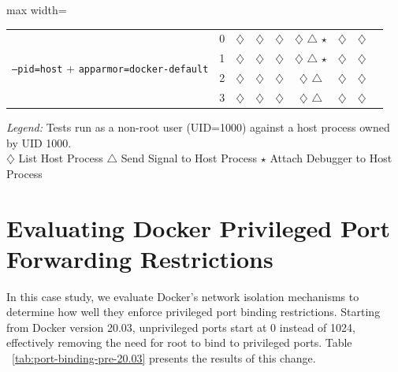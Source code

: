 \documentclass[12pt]{report}
\begin{document}
\begin{doublespace}
\begin{table}[!h]
\begin{adjustbox}{max width=\textwidth}
\begin{tabular}{|l|c|c|c|c|c|c|c|c|}
        \multirow{4}{*}{\texttt{--pid=host} + \texttt{apparmor=docker-default}} 
            & 0 & $\diamondsuit$ & $\diamondsuit$ & $\diamondsuit$ & $\diamondsuit$ $\triangle$ $\star$ & $\diamondsuit$ & $\diamondsuit$ \\
            & 1 & $\diamondsuit$ & $\diamondsuit$ & $\diamondsuit$ & $\diamondsuit$ $\triangle$ $\star$ & $\diamondsuit$ & $\diamondsuit$ \\
            & 2 & $\diamondsuit$ & $\diamondsuit$ & $\diamondsuit$ & $\diamondsuit$ $\triangle$ & $\diamondsuit$ & $\diamondsuit$ \\
            & 3 & $\diamondsuit$ & $\diamondsuit$ & $\diamondsuit$ & $\diamondsuit$ $\triangle$ & $\diamondsuit$ & $\diamondsuit$ \\
        \hline
    \end{tabular}
    \end{adjustbox}
    \textit{Legend:}{
        Tests run as a non-root user (UID=1000) against a host process owned by UID 1000.\\
        $\diamondsuit$ List Host Process \quad 
        $\triangle$ Send Signal to Host Process \quad 
        $\star$ Attach Debugger to Host Process
    }
\end{table}
























\section{Evaluating Docker Privileged Port Forwarding Restrictions}
\label{sec:evaluating-docker-privileged-port-forwarding-restrictions}

In this case study, we evaluate Docker's network isolation mechanisms to determine how well they enforce privileged port binding restrictions. Starting from Docker version 20.03, unprivileged ports start at 0 instead of 1024, effectively removing the need for root to bind to privileged ports. Table ~\ref{tab:port-binding-pre-20.03} presents the results of this change.


\end{doublespace}
\end{document}
